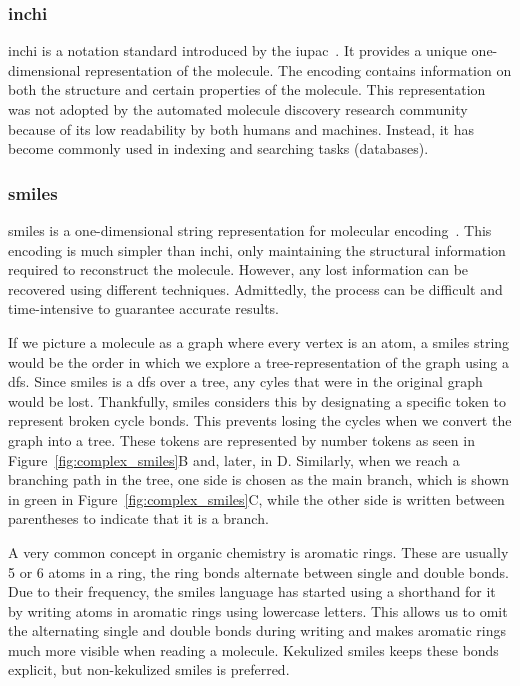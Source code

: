 \documentclass[../Document.tex]{subfiles}
\begin{document}
\subsubsection{\acrshort{inchi}}
\gls{inchi} is a notation standard introduced by the \gls{iupac}~\cite{inchi_intro}. It provides a unique one-dimensional representation of the molecule. The encoding contains information on both the structure and certain properties of the molecule. This representation was not adopted by the automated molecule discovery research community because of its low readability by both humans and machines. Instead, it has become commonly used in indexing and searching tasks (\eg databases).

\subsubsection{\acrshort{smiles}}
\gls{smiles} is a one-dimensional string representation for molecular encoding~\cite{smiles_intro}. This encoding is much simpler than \gls{inchi}, only maintaining the structural information required to reconstruct the molecule. However, any lost information can be recovered using different techniques. Admittedly, the process can be difficult and time-intensive to guarantee accurate results.

If we picture a molecule as a graph where every vertex is an atom, a \gls{smiles} string would be the order in which we explore a tree-representation of the graph using a \gls{dfs}.
Since \gls{smiles} is a \gls{dfs} over a tree, any cyles that were in the original graph would be lost. Thankfully, \gls{smiles} considers this by designating a specific token to represent broken cycle bonds. This prevents losing the cycles when we convert the graph into a tree. These tokens are represented by number tokens as seen in Figure~\ref{fig:complex_smiles}B and, later, in D.
Similarly, when we reach a branching path in the tree, one side is chosen as the main branch, which is shown in green in Figure~\ref{fig:complex_smiles}C, while the other side is written between parentheses to indicate that it is a branch.

A very common concept in organic chemistry is aromatic rings. These are usually 5 or 6 atoms in a ring, the ring bonds alternate between single and double bonds. Due to their frequency, the \gls{smiles} language has started using a shorthand for it by writing atoms in aromatic rings using lowercase letters. This allows us to omit the alternating single and double bonds during writing and makes aromatic rings much more visible when reading a molecule.
Kekulized \gls{smiles} keeps these bonds explicit, but non-kekulized \gls{smiles} is preferred.
\end{document}
